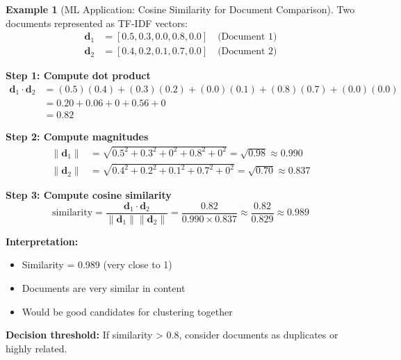 \documentclass[12pt,a4paper]{article}
\theoremstyle{definition}
\newtheorem{example}{Example}[section]
\begin{document}
\begin{example}[ML Application: Cosine Similarity for Document Comparison]
Two documents represented as TF-IDF vectors:
\begin{align}
\mathbf{d}_1 &= [0.5, 0.3, 0.0, 0.8, 0.0] \quad \text{(Document 1)} \\
\mathbf{d}_2 &= [0.4, 0.2, 0.1, 0.7, 0.0] \quad \text{(Document 2)}
\end{align}

\textbf{Step 1: Compute dot product}
\begin{align}
\mathbf{d}_1 \cdot \mathbf{d}_2 &= (0.5)(0.4) + (0.3)(0.2) + (0.0)(0.1) + (0.8)(0.7) + (0.0)(0.0) \\
&= 0.20 + 0.06 + 0 + 0.56 + 0 \\
&= 0.82
\end{align}

\textbf{Step 2: Compute magnitudes}
\begin{align}
\|\mathbf{d}_1\| &= \sqrt{0.5^2 + 0.3^2 + 0^2 + 0.8^2 + 0^2} = \sqrt{0.98} \approx 0.990 \\
\|\mathbf{d}_2\| &= \sqrt{0.4^2 + 0.2^2 + 0.1^2 + 0.7^2 + 0^2} = \sqrt{0.70} \approx 0.837
\end{align}

\textbf{Step 3: Compute cosine similarity}
\begin{equation}
\text{similarity} = \frac{\mathbf{d}_1 \cdot \mathbf{d}_2}{\|\mathbf{d}_1\| \|\mathbf{d}_2\|} = \frac{0.82}{0.990 \times 0.837} \approx \frac{0.82}{0.829} \approx 0.989
\end{equation}

\textbf{Interpretation:}
\begin{itemize}
    \item Similarity = 0.989 (very close to 1)
    \item Documents are very similar in content
    \item Would be good candidates for clustering together
\end{itemize}

\textbf{Decision threshold:} If similarity > 0.8, consider documents as duplicates or highly related.
\end{example}
\end{document}
